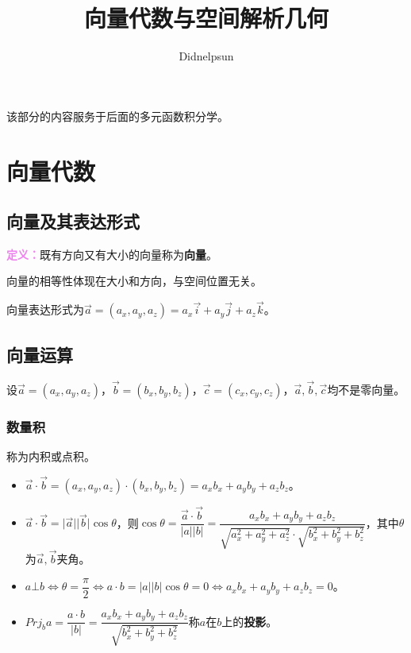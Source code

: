 \documentclass[UTF8, 12pt]{ctexart}
\author{Didnelpsun}
\title{向量代数与空间解析几何}
\date{}
\begin{document}
\maketitle
\pagestyle{empty}
\thispagestyle{empty}
\tableofcontents
\thispagestyle{empty}
\newpage
\pagestyle{plain}
\setcounter{page}{1}

该部分的内容服务于后面的多元函数积分学。

\section{向量代数}

\subsection{向量及其表达形式}

\textcolor{violet}{\textbf{定义：}}既有方向又有大小的向量称为\textbf{向量}。

向量的相等性体现在大小和方向，与空间位置无关。

向量表达形式为$\vec{a}=(a_x,a_y,a_z)=a_x\vec{i}+a_y\vec{j}+a_z\vec{k}$。

\subsection{向量运算}

设$\vec{a}=(a_x,a_y,a_z)$，$\vec{b}=(b_x,b_y,b_z)$，$\vec{c}=(c_x,c_y,c_z)$，$\vec{a},\vec{b},\vec{c}$均不是零向量。

\subsubsection{数量积}

称为内积或点积。

\begin{itemize}
    \item $\vec{a}\cdot\vec{b}=(a_x,a_y,a_z)\cdot(b_x,b_y,b_z)=a_xb_x+a_yb_y+a_zb_z$。
    \item $\vec{a}\cdot\vec{b}=\vert\vec{a}\vert\vert\vec{b}\vert\cos\theta$，则$\cos\theta=\dfrac{\vec{a}\cdot\vec{b}}{\vert a\vert\vert b\vert}=\dfrac{a_xb_x+a_yb_y+a_zb_z}{\sqrt{a_x^2+a_y^2+a_z^2}\cdot\sqrt{b_x^2+b_y^2+b_z^2}}$，其中$\theta$为$\vec{a},\vec{b}$夹角。
    \item $a\bot b\Leftrightarrow\theta=\dfrac{\pi}{2}\Leftrightarrow a\cdot b=\vert a\vert\vert b\vert\cos\theta=0\Leftrightarrow a_xb_x+a_yb_y+a_zb_z=0$。
    \item $Prj_ba=\dfrac{a\cdot b}{\vert b\vert}=\dfrac{a_xb_x+a_yb_y+a_zb_z}{\sqrt{b_x^2+b_y^2+b_z^2}}$称$a$在$b$上的\textbf{投影}。
\end{itemize}
\end{document}
